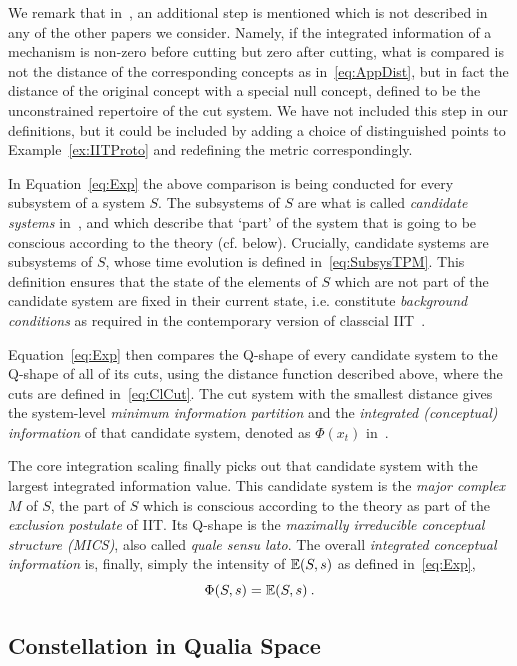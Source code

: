 We remark that in~\cite[S1]{mayner2018pyphi}, an additional step is mentioned which is not described in any of the other papers we consider. Namely, if the integrated information of a mechanism is non-zero before cutting but zero after cutting, what is compared is not the distance of the corresponding concepts as in~\eqref{eq:AppDist}, but in fact the distance of the original concept with a special null concept, defined to be the unconstrained repertoire of the cut system. We have not included this step in our definitions, but it could be included by adding a choice of distinguished points to Example~\ref{ex:IITProto} and redefining the metric correspondingly.

In Equation~\eqref{eq:Exp} the above comparison is being conducted for every subsystem of a system $S$.
The subsystems of $S$ are what is called \emph{candidate systems} in~\cite{oizumi2014phenomenology}, and which describe that `part' of the system that is going to be conscious according to the theory (cf. below).  Crucially, candidate systems are subsystems of $S$, whose time evolution is defined in~\eqref{eq:SubsysTPM}. This definition ensures that the state of the elements of $S$ which are not part of the candidate system are fixed in their current state, i.e. constitute \emph{background conditions} as required in the contemporary version of classcial IIT~\cite{mayner2018pyphi}.

Equation~\eqref{eq:Exp} then compares the Q-shape of every candidate system to the Q-shape of all of its cuts, using the distance function described above, where the cuts are defined in~\eqref{eq:ClCut}. The cut system with the smallest distance gives the system-level \emph{minimum information partition} and the \emph{integrated (conceptual) information} of that candidate system, denoted as $\Phi(x_t)$ in~\cite{tononi.2015.scholarpedia}. 

The core integration scaling finally picks out that candidate system with the largest integrated information value. This candidate system is the \emph{major complex} $M$ of $S$, the part of $S$ which is conscious according to the theory as part of the \emph{exclusion postulate} of IIT. Its Q-shape is the 
\emph{maximally irreducible conceptual structure (MICS)}, also called \emph{quale sensu lato}. The overall \emph{integrated conceptual information} is, finally, simply the intensity of $\mathbb{E}(S,s)$ as defined in~\eqref{eq:Exp},
\[
\Phi(S,s) = \mathbb{E}(S,s) \:.
\]

\subsection{Constellation in Qualia Space}

